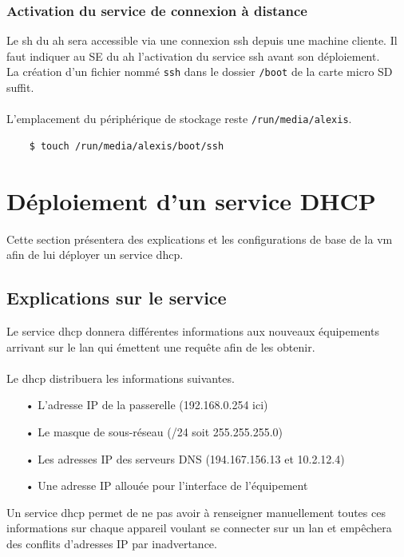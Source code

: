 \documentclass[a4paper]{article}
\begin{document}
\subsubsection{Activation du service de connexion à distance}
\indent Le \gls{sh} du \acrshort{ah} sera accessible via une connexion \gls{ssh} depuis une machine cliente. Il faut indiquer au SE du \acrshort{ah} l'activation du service \gls{ssh} avant son déploiement.\\La création d'un fichier nommé \verb|ssh| dans le dossier \verb|/boot| de la carte micro SD suffit.\\\\L'emplacement du périphérique de stockage reste \verb|/run/media/alexis|.
\begin{lstlisting}
    $ touch /run/media/alexis/boot/ssh
\end{lstlisting}
\section{Déploiement d'un service DHCP}
Cette section présentera des explications et les configurations de base de la \acrshort{vm} afin de lui déployer un service \gls{dhcp}.
\subsection{Explications sur le service}
\label{sec:dhcpe}
Le service \gls{dhcp} donnera différentes informations aux nouveaux équipements arrivant sur le \gls{lan} qui émettent une requête afin de les obtenir.\\\\Le \gls{dhcp} distribuera les informations suivantes.
\begin{itemize}
    \item[•] L'adresse IP de la passerelle (192.168.0.254 ici)
    \item[•] Le masque de sous-réseau (/24 soit 255.255.255.0)
    \item[•] Les adresses IP des serveurs DNS (194.167.156.13 et 10.2.12.4)
    \item[•] Une adresse IP allouée pour l'interface de l'équipement
\end{itemize}
Un service \gls{dhcp} permet de ne pas avoir à renseigner manuellement toutes ces informations sur chaque appareil voulant se connecter sur un \gls{lan} et empêchera des conflits d'adresses IP par inadvertance.
\end{document}
